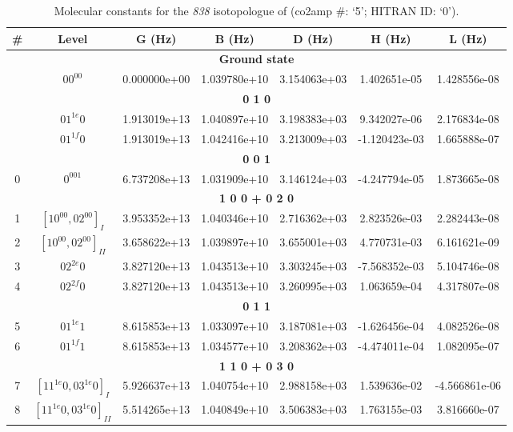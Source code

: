 \begin{table}[h!]
\caption{Molecular constants for the \textit{838} isotopologue of  (co2amp \#: ‘5’; HITRAN ID: ‘0’).}
\label{table:constants_838}
\centering
\begin{tabular}{|c|c|c|c|c|c|c|}
\hline
\textbf{\#} & \textbf{Level} & \textbf{G (Hz)} & \textbf{B (Hz)} & \textbf{D (Hz)} & \textbf{H (Hz)} & \textbf{L (Hz)} \\ \hline
\multicolumn{7}{|c|}{\textbf{Ground state}} \\ \hline
 & $00^00$ & 0.000000e+00 & 1.039780e+10 & 3.154063e+03 & 1.402651e-05 & 1.428556e-08 \\ \hline
\multicolumn{7}{|c|}{\textbf{0 1 0}} \\ \hline
 & $01^{1e}0$ & 1.913019e+13 & 1.040897e+10 & 3.198383e+03 & 9.342027e-06 & 2.176834e-08 \\ \hline
 & $01^{1f}0$ & 1.913019e+13 & 1.042416e+10 & 3.213009e+03 & -1.120423e-03 & 1.665888e-07 \\ \hline
\multicolumn{7}{|c|}{\textbf{0 0 1}} \\ \hline
0 & $0^001$ & 6.737208e+13 & 1.031909e+10 & 3.146124e+03 & -4.247794e-05 & 1.873665e-08 \\ \hline
\multicolumn{7}{|c|}{\textbf{1 0 0 + 0 2 0}} \\ \hline
1 & $[10^00, 02^00]_{I}$ & 3.953352e+13 & 1.040346e+10 & 2.716362e+03 & 2.823526e-03 & 2.282443e-08 \\ \hline
2 & $[10^00, 02^00]_{II}$ & 3.658622e+13 & 1.039897e+10 & 3.655001e+03 & 4.770731e-03 & 6.161621e-09 \\ \hline
3 & $02^{2e}0$ & 3.827120e+13 & 1.043513e+10 & 3.303245e+03 & -7.568352e-03 & 5.104746e-08 \\ \hline
4 & $02^{2f}0$ & 3.827120e+13 & 1.043513e+10 & 3.260995e+03 & 1.063659e-04 & 4.317807e-08 \\ \hline
\multicolumn{7}{|c|}{\textbf{0 1 1}} \\ \hline
5 & $01^{1e}1$ & 8.615853e+13 & 1.033097e+10 & 3.187081e+03 & -1.626456e-04 & 4.082526e-08 \\ \hline
6 & $01^{1f}1$ & 8.615853e+13 & 1.034577e+10 & 3.208362e+03 & -4.474011e-04 & 1.082095e-07 \\ \hline
\multicolumn{7}{|c|}{\textbf{1 1 0 + 0 3 0}} \\ \hline
7 & $[11^{1e}0, 03^{1e}0]_{I}$ & 5.926637e+13 & 1.040754e+10 & 2.988158e+03 & 1.539636e-02 & -4.566861e-06 \\ \hline
8 & $[11^{1e}0, 03^{1e}0]_{II}$ & 5.514265e+13 & 1.040849e+10 & 3.506383e+03 & 1.763155e-03 & 3.816660e-07 \\ \hline

\end{tabular}
\end{table}
